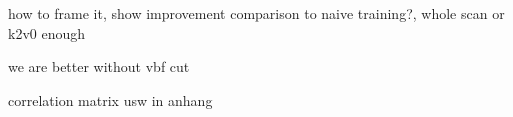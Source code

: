 how to frame it, show improvement comparison to naive training?, whole scan or k2v0 enough

we are better without vbf cut

correlation matrix usw in anhang


